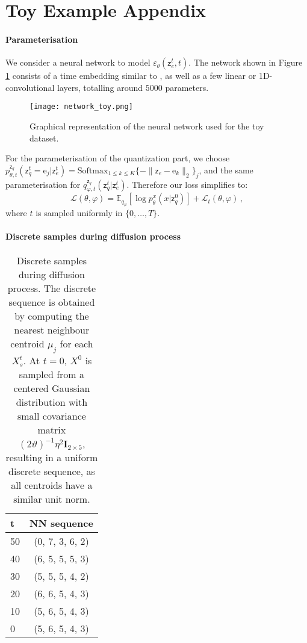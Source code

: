 \documentclass{article}
\theoremstyle{plain}
\theoremstyle{definition}
\theoremstyle{remark}
\newcommand{\latentcont}{\mathsf{z}_e}
\newcommand{\latentdis}{\mathsf{z}_q}
\newcommand{\rme}{\mathrm{e}}
\newcommand{\embed}{\rme}
\begin{document}
\section{Toy Example Appendix}
\label{ap:additionaltoy}

\paragraph{Parameterisation}

We consider a neural network to model  $\varepsilon_\theta(\latentcont^t ,t)$. The network shown in Figure  \ref{ap:fig:toynetwork} consists of a time embedding similar to \cite{ho2020denoising}, as well as a few linear or 1D-convolutional layers, totalling around $5000$ parameters.

\begin{figure}[h!]
    \centering
    \texttt{[image: network\_toy.png]}
    \caption{Graphical representation of the neural network used for the toy dataset.}
    \label{ap:fig:toynetwork}
\end{figure}

For the parameterisation of the quantization part, we choose $p_{\theta,t}^{\latentdis}(\latentdis^{t}=\embed_j|\latentcont^{t}) = \mathrm{Softmax}_{1\leq k \leq K}\{-\|\latentcont - \embed_k\|_2\}_j$, and the same parameterisation for $q_{\varphi,t}^{\latentdis}(\latentdis^{t}|\latentcont^{t})$. Therefore our loss simplifies to:
$$
\mathcal{L}(\theta,\varphi) = \mathbb{E}_{q_{\varphi}}\left[\log p^x_{\theta}(x|\latentdis^{0})\right] +  \mathcal{L}_t(\theta,\varphi)\,,
$$
where $t$ is sampled uniformly in $\{0,\ldots,T\}$.

\paragraph{Discrete samples during diffusion process}

\begin{table}[h!]
    
    \centering
    \begin{tabular}{l|c}
        t & NN sequence \\
        \hline
        50& (0, 7, 3, 6, 2)\\
        40& (6, 5, 5, 5, 3)\\
        30& (5, 5, 5, 4, 2)\\
        20& (6, 6, 5, 4, 3)\\
        10& (5, 6, 5, 4, 3)\\
        0& (5, 6, 5, 4, 3)
    \end{tabular}
    \caption{\label{ap:tab:discretetoy} Discrete samples during diffusion process. The discrete sequence is obtained by computing the nearest neighbour centroid $\mu_j$ for each $X^t_s$. At $t=0$, $X^0$ is sampled from a centered Gaussian distribution with small covariance matrix $(2\vartheta)^{-1}\eta^2\mathbf{I}_{2\times 5}$, resulting in a uniform discrete sequence, as all centroids have a similar unit norm.}

\end{table}
\end{document}
